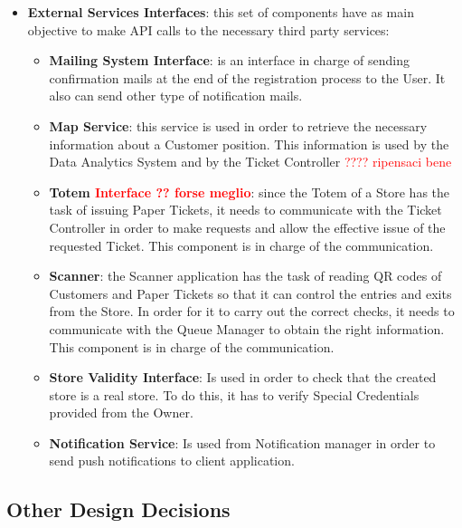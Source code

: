 \documentclass[a4paper, 12pt, oneside, table]{article}
\newcommand{\yasmin}[1]{\textcolor{Red}{#1}}
\begin{document}
\begin{itemize}
\begin{itemize}
    \end{itemize}
    \item \textbf{External Services Interfaces}: this set of components have as main objective to make API calls to the necessary third party services:
    \begin{itemize}
        \item \textbf{Mailing System Interface}: is an interface in charge of sending confirmation mails at the end of the registration process to the User. It also can send other type of notification mails.
        \item \textbf{Map Service}: this service is used in order to retrieve the necessary information about a Customer position. This information is used by the Data Analytics System and by the Ticket Controller \yasmin{???? ripensaci bene}
        \item \textbf{Totem \yasmin{Interface ?? forse meglio}}: since the Totem of a Store has the task of issuing Paper Tickets, it needs to communicate with the Ticket Controller in order to make requests and allow the effective issue of the requested Ticket. This component is in charge of the communication.
        \item \textbf{Scanner}: the Scanner application has the task of reading QR codes of Customers and Paper Tickets so that it can control the entries and exits from the Store. In order for it to carry out the correct checks, it needs to communicate with the Queue Manager to obtain the right information. This component is in charge of the communication.
        \item \textbf{Store Validity Interface}: Is used in order to check that the created store is a real store. To do this, it has to verify Special Credentials provided from the Owner.
        
        \item \textbf{Notification Service}: Is used from Notification manager in order to send push notifications to client application.
    \end{itemize}
    
\end{itemize}

\subsection{Other Design Decisions}
\end{document}
